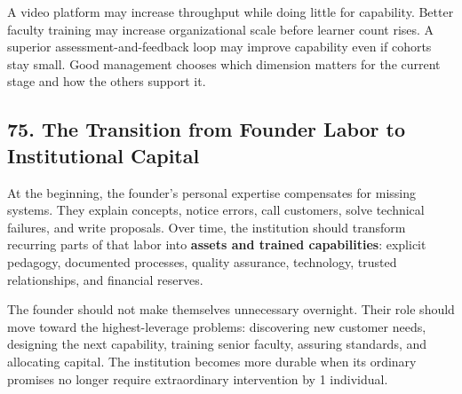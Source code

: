 A video platform may increase throughput while doing little for capability. Better faculty training may increase organizational scale before learner count rises. A superior assessment-and-feedback loop may improve capability even if cohorts stay small. Good management chooses which dimension matters for the current stage and how the others support it.

\subsection*{75. The Transition from Founder Labor to Institutional Capital}

At the beginning, the founder's personal expertise compensates for missing systems. They explain concepts, notice errors, call customers, solve technical failures, and write proposals. Over time, the institution should transform recurring parts of that labor into \textbf{assets and trained capabilities}: explicit pedagogy, documented processes, quality assurance, technology, trusted relationships, and financial reserves.

The founder should not make themselves unnecessary overnight. Their role should move toward the highest-leverage problems: discovering new customer needs, designing the next capability, training senior faculty, assuring standards, and allocating capital. The institution becomes more durable when its ordinary promises no longer require extraordinary intervention by 1 individual.
